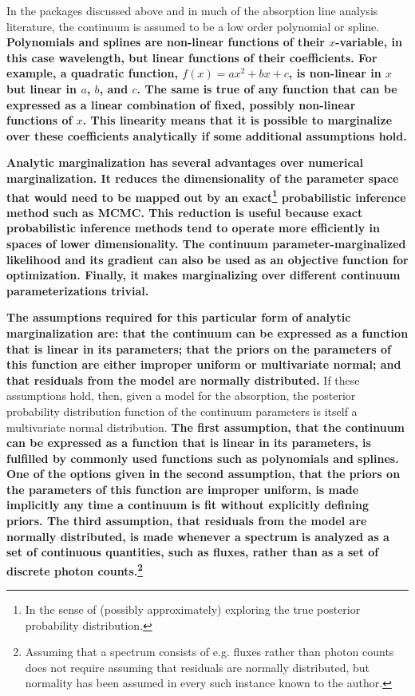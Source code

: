 \documentclass[manuscript]{aastex62}
\begin{document}
In the packages discussed above and in much of the absorption line analysis literature, the continuum is assumed to be a low order polynomial or spline.
{\bf Polynomials and splines are non-linear functions of their $x$-variable, in this case wavelength, but linear functions of their coefficients.
For example, a quadratic function, $f(x) = a x^2 + b x + c$, is non-linear in $x$ but linear in $a$, $b$, and $c$.
The same is true of any function that can be expressed as a linear combination of fixed, possibly non-linear functions of $x$.
This linearity means that it is possible to marginalize over these coefficients analytically if some additional assumptions hold.}

{\bf
Analytic marginalization has several advantages over numerical marginalization.
It reduces the dimensionality of the parameter space that would need to be mapped out by an exact\footnote{In the sense of (possibly approximately) exploring the true posterior probability distribution.} probabilistic inference method such as MCMC.
This reduction is useful because exact probabilistic inference methods tend to operate more efficiently in spaces of lower dimensionality.
The continuum parameter-marginalized likelihood and its gradient can also be used as an objective function for optimization.
Finally, it makes marginalizing over different continuum parameterizations trivial.
}

{\bf The assumptions required for this particular form of analytic marginalization are: that the continuum can be expressed as a function that is linear in its parameters; that the priors on the parameters of this function are either improper uniform or multivariate normal; and that residuals from the model are normally distributed.}
If these assumptions hold, then, given a model for the absorption, the posterior probability distribution function of the continuum parameters is itself a multivariate normal distribution.
{\bf The first assumption, that the continuum can be expressed as a function that is linear in its parameters, is fulfilled by commonly used functions such as polynomials and splines.
One of the options given in the second assumption, that the priors on the parameters of this function are improper uniform, is made implicitly any time a continuum is fit without explicitly defining priors.
The third assumption, that residuals from the model are normally distributed, is made whenever a spectrum is analyzed as a set of continuous quantities, such as fluxes, rather than as a set of discrete photon counts.\footnote{Assuming that a spectrum consists of e.g. fluxes rather than photon counts does not require assuming that residuals are normally distributed, but normality has been assumed in every such instance known to the author.}}
\end{document}

